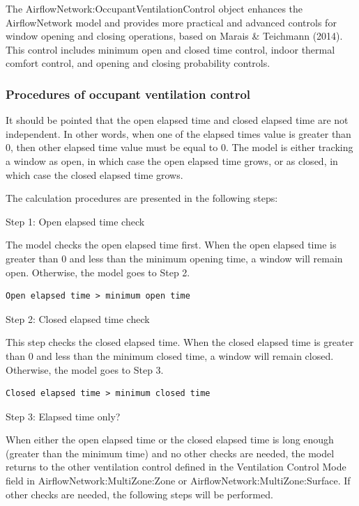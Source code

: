 The AirflowNetwork:OccupantVentilationControl object enhances the AirflowNetwork model and provides more practical and advanced controls for window opening and closing operations, based on Marais \& Teichmann (2014). This control includes minimum open and closed time control, indoor thermal comfort control, and opening and closing probability controls.

\subsubsection{Procedures of occupant ventilation control}\label{procedures-of-occupant-ventilation-control}

It should be pointed that the open elapsed time and closed elapsed time are not independent. In other words, when one of the elapsed times value is greater than 0, then other elapsed time value must be equal to 0. The model is either tracking a window as open, in which case the open elapsed time grows, or as closed, in which case the closed elapsed time grows.

The calculation procedures are presented in the following steps:

Step 1: Open elapsed time check

The model checks the open elapsed time first. When the open elapsed time is greater than 0 and less than the minimum opening time, a window will remain open. Otherwise, the model goes to Step 2.

\begin{lstlisting}
Open elapsed time > minimum open time
\end{lstlisting}

Step 2: Closed elapsed time check

This step checks the closed elapsed time. When the closed elapsed time is greater than 0 and less than the minimum closed time, a window will remain closed. Otherwise, the model goes to Step 3.

\begin{lstlisting}
Closed elapsed time > minimum closed time
\end{lstlisting}

Step 3: Elapsed time only?

When either the open elapsed time or the closed elapsed time is long enough (greater than the minimum time) and no other checks are needed, the model returns to the other ventilation control defined in the Ventilation Control Mode field in AirflowNetwork:MultiZone:Zone or AirflowNetwork:MultiZone:Surface. If other checks are needed, the following steps will be performed.

